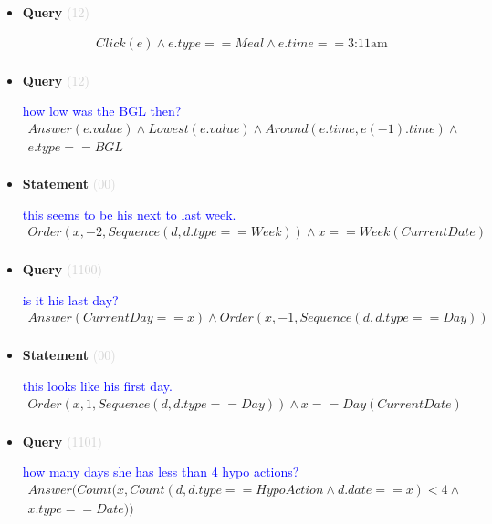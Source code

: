 \documentclass[11pt]{article}
\newcommand{\key}[1]{\textcolor{lightgray}{#1}}
\newcounter{CQuery}
\newcounter{CStatement}
\begin{document}
\begin{itemize}
\item
\textbf{Query\theCQuery} \key{(12)} \addtocounter{CQuery}{1}
\textcolor{blue}{  }
\begin{multline*}
Click(e) \wedge e.type == Meal \wedge e.time==\mbox{3:11am} \\ 
\end{multline*}


\item
\textbf{Query\theCQuery} \key{(12)} \addtocounter{CQuery}{1}
\textcolor{blue}{ how low was the BGL then? }
\begin{multline*}
Answer(e.value) \wedge Lowest(e.value) \wedge Around(e.time, e(-1).time) \wedge \\ 
e.type==BGL \\ 
\end{multline*}


\item
\textbf{Statement\theCStatement} \key{(00)} \addtocounter{CStatement}{1}
\textcolor{blue}{ this seems to be his next to last week. }
\begin{multline*}
Order(x, -2, Sequence(d, d.type==Week)) \wedge x==Week(CurrentDate) \\ 
\end{multline*}


\item
\textbf{Query\theCQuery} \key{(1100)} \addtocounter{CQuery}{1}
\textcolor{blue}{ is it his last day? }
\begin{multline*}
Answer(CurrentDay==x) \wedge Order(x, -1, Sequence(d, d.type==Day)) \\ 
\end{multline*}


\item
\textbf{Statement\theCStatement} \key{(00)} \addtocounter{CStatement}{1}
\textcolor{blue}{ this looks like his first day. }
\begin{multline*}
Order(x, 1, Sequence(d, d.type==Day)) \wedge x==Day(CurrentDate) \\ 
\end{multline*}


\item
\textbf{Query\theCQuery} \key{(1101)} \addtocounter{CQuery}{1}
\textcolor{blue}{ how many days she has less than 4 hypo actions? }
\begin{multline*}
Answer(Count(x, Count(d, d.type==HypoAction \wedge d.date==x)<4 \wedge \\ 
x.type==Date)) \\ 
\end{multline*}



\end{itemize}
\end{document}
